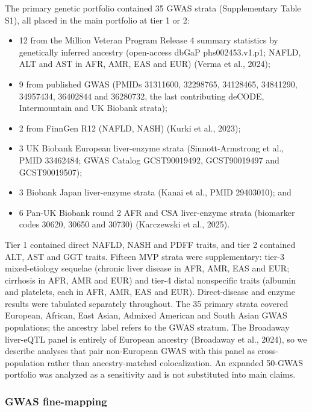 The primary genetic portfolio contained 35 GWAS strata (Supplementary Table S1), all placed in the main portfolio at tier 1 or 2:

\begin{itemize}
\tightlist
\item
  12 from the Million Veteran Program Release 4 summary statistics by genetically inferred ancestry (open-access dbGaP phs002453.v1.p1; NAFLD, ALT and AST in AFR, AMR, EAS and EUR) (Verma et al., 2024);
\item
  9 from published GWAS (PMIDs 31311600, 32298765, 34128465, 34841290, 34957434, 36402844 and 36280732, the last contributing deCODE, Intermountain and UK Biobank strata);
\item
  2 from FinnGen R12 (NAFLD, NASH) (Kurki et al., 2023);
\item
  3 UK Biobank European liver-enzyme strata (Sinnott-Armstrong et al., PMID 33462484; GWAS Catalog GCST90019492, GCST90019497 and GCST90019507);
\item
  3 Biobank Japan liver-enzyme strata (Kanai et al., PMID 29403010); and
\item
  6 Pan-UK Biobank round 2 AFR and CSA liver-enzyme strata (biomarker codes 30620, 30650 and 30730) (Karczewski et al., 2025).
\end{itemize}

Tier 1 contained direct NAFLD, NASH and PDFF traits, and tier 2 contained ALT, AST and GGT traits. Fifteen MVP strata were supplementary: tier-3 mixed-etiology sequelae (chronic liver disease in AFR, AMR, EAS and EUR; cirrhosis in AFR, AMR and EUR) and tier-4 distal nonspecific traits (albumin and platelets, each in AFR, AMR, EAS and EUR). Direct-disease and enzyme results were tabulated separately throughout. The 35 primary strata covered European, African, East Asian, Admixed American and South Asian GWAS populations; the ancestry label refers to the GWAS stratum. The Broadaway liver-eQTL panel is entirely of European ancestry (Broadaway et al., 2024), so we describe analyses that pair non-European GWAS with this panel as cross-population rather than ancestry-matched colocalization. An expanded 50-GWAS portfolio was analyzed as a sensitivity and is not substituted into main claims.

\subsubsection{GWAS fine-mapping}\label{gwas-fine-mapping}

